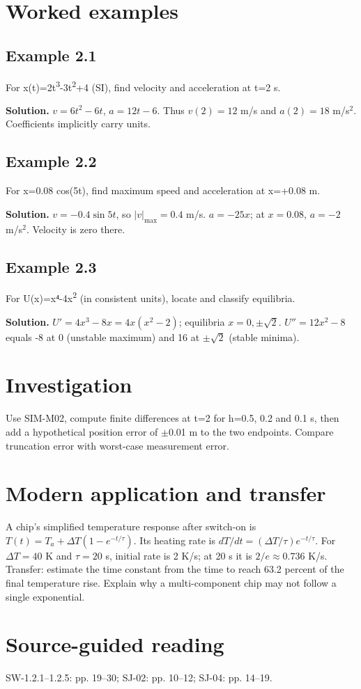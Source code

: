 \documentclass[11pt,a4paper,openany]{book}
\begin{document}
\section{Worked examples}
\subsection*{Example 2.1}
For x(t)=2t\textsuperscript{3}-3t\textsuperscript{2}+4 (SI), find velocity and acceleration at t=2 s.

\textbf{Solution.} $v=6t^2-6t$, $a=12t-6$. Thus $v(2)=12$ m/s and $a(2)=18$ m/s$^2$. Coefficients implicitly carry units.
\subsection*{Example 2.2}
For x=0.08 cos(5t), find maximum speed and acceleration at x=+0.08 m.

\textbf{Solution.} $v=-0.4\sin5t$, so $|v|_{\max}=0.4$ m/s. $a=-25x$; at $x=0.08$, $a=-2$ m/s$^2$. Velocity is zero there.
\subsection*{Example 2.3}
For U(x)=x⁴-4x\textsuperscript{2} (in consistent units), locate and classify equilibria.

\textbf{Solution.} $U'=4x^3-8x=4x(x^2-2)$; equilibria $x=0,\pm\sqrt2$. $U''=12x^2-8$ equals -8 at 0 (unstable maximum) and 16 at $\pm\sqrt2$ (stable minima).
\section{Investigation}
Use SIM-M02, compute finite differences at t=2 for h=0.5, 0.2 and 0.1 s, then add a hypothetical position error of \ensuremath{\pm}0.01 m to the two endpoints. Compare truncation error with worst-case measurement error.
\section{Modern application and transfer}
A chip's simplified temperature response after switch-on is $T(t)=T_a+\Delta T(1-e^{-t/\tau})$. Its heating rate is $dT/dt=(\Delta T/\tau)e^{-t/\tau}$. For $\Delta T=40$ K and $\tau=20$ s, initial rate is 2 K/s; at 20 s it is $2/e\approx0.736$ K/s. Transfer: estimate the time constant from the time to reach 63.2 percent of the final temperature rise. Explain why a multi-component chip may not follow a single exponential.
\section{Source-guided reading}
SW-1.2.1–1.2.5: pp. 19–30; SJ-02: pp. 10–12; SJ-04: pp. 14–19.
\end{document}
